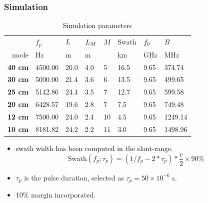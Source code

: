 \documentclass{beamer}
\begin{document}
%
\begin{frame}
\frametitle{Simulation}
\begin{table}[ht!]
\begin{center}
 \caption{Simulation parameters}
 \label{tb:simulation}
 \begin{tabular}{r|l|l|l|l|l|l|l}
  {} & {\bf $f_p$} & {\bf $L$} & {\bf $L_M$} & {\bf $M$} & {Swath} & {\bf $f_0$} & {\bf $B$}\\
 {mode}      & {Hz}    & m    & m   &   & km   & GHz  & MHz\\\hline
 {\bf 40 cm} & 4500.00 & 20.0 & 4.0 & 5 & 16.5 & 9.65 & 374.74\\\hline
 {\bf 30 cm} & 5000.00 & 21.4 & 3.6 & 6 & 13.5 & 9.65 & 499.65\\\hline
 {\bf 25 cm} & 5142.86 & 24.4 & 3.5 & 7 & 12.7 & 9.65 & 599.58\\\hline
 {\bf 20 cm} & 6428.57 & 19.6 & 2.8 & 7 & 7.5  & 9.65 & 749.48\\\hline
 {\bf 12 cm} & 7500.00 & 24.0 & 2.4 & 10 & 4.5 & 9.65 & 1249.14\\\hline
 {\bf 10 cm} & 8181.82 & 24.2 & 2.2 & 11 & 3.0 & 9.65 & 1498.96\\\hline
 \end{tabular}
 \end{center}
\end{table}
\begin{itemize}
\item swath width has been computed in the slant-range.
\begin{equation}
 \text{Swath}(f_p; \tau_p) = \left(1/f_p - 2*\tau_p\right)*\frac{c}{2}\times 90\%
\end{equation}
\item $\tau_p$ is the pulse duration, selected as $\tau_p=50\times10^{-6}$ s. 
\item 10\% margin incorporated.
\end{itemize}
\end{frame}
%
\end{document}
